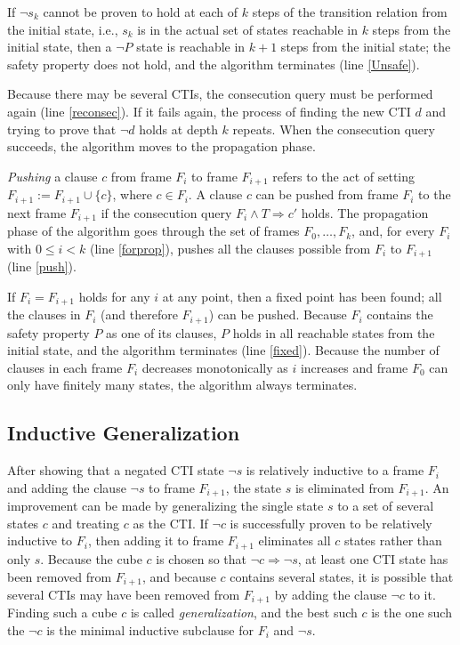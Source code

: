 \documentclass[12pt,a4paper,twoside,openright]{report}
\begin{document}
{{If $\neg s_k$ cannot be proven to hold at each of $k$ steps of
the transition relation from the initial state, i.e., $s_k$ is in the actual
set of states reachable in $k$ steps from the initial state, then a $\neg P$ state
is reachable in $k + 1$ steps from the initial state; the safety property does not
hold, and the algorithm terminates (line \ref{Unsafe}).

Because there may be several CTIs,
the consecution query must be performed again (line \ref{reconsec}). If it fails again,
the process of finding the new CTI $d$ and trying to
prove that $\neg d$ holds at depth $k$ repeats.
When the consecution query succeeds, the algorithm moves to the propagation phase.

\emph{Pushing} a clause $c$ from frame $F_i$ to frame $F_{i + 1}$ refers to the act
of setting $F_{i + 1} := F_{i + 1} \cup \{ c \}$, where $c \in F_i$.
A clause $c$ can be pushed from frame $F_i$ to the next frame $F_{i + 1}$
if the consecution query $F_i \wedge T \Rightarrow c'$ holds.
The propagation phase of the algorithm goes through the set of frames
$F_0, \ldots, F_k$, and, for every $F_i$ with $0 \leq i < k$ (line \ref{forprop}),
pushes all the clauses possible from $F_i$ to $F_{i + 1}$ (line \ref{push}).

If $F_i = F_{i + 1}$ holds for any $i$ at any point, then a fixed point has
been found; all the clauses in $F_i$ (and therefore $F_{i + 1}$)
can be pushed.
Because $F_i$ contains the safety property $P$ as one of its clauses,
$P$ holds in all reachable states from the initial state,
and the algorithm terminates (line \ref{fixed}). Because the number of
clauses in each frame $F_i$ decreases monotonically as $i$ increases and
frame $F_0$ can only have finitely many states, the algorithm always
terminates.

\subsection{Inductive Generalization}

After showing that a negated CTI state $\neg s$ is relatively inductive to a
frame $F_i$ and adding the clause $\neg s$ to frame $F_{i + 1}$, the state
$s$ is eliminated from $F_{i + 1}$. An improvement can be made by generalizing
the single state $s$ to a set of several states $c$ and treating
$c$ as the CTI. If $\neg c$ is successfully proven to be relatively inductive
to $F_i$, then adding it to frame $F_{i + 1}$ eliminates
all $c$ states rather than only $s$. Because the cube $c$
is chosen so that $\neg c \Rightarrow \neg s$, at least one CTI state
has been removed from $F_{i + 1}$, and because $c$ contains several states,
it is possible that several CTIs may have been removed from $F_{i + 1}$
by adding the clause $\neg c$ to it. Finding such a cube $c$
is called \emph{generalization}, and the best such $c$ is the
one such the $\neg c$ is the minimal inductive subclause for $F_i$ and $\neg s$.

}}
\end{document}
